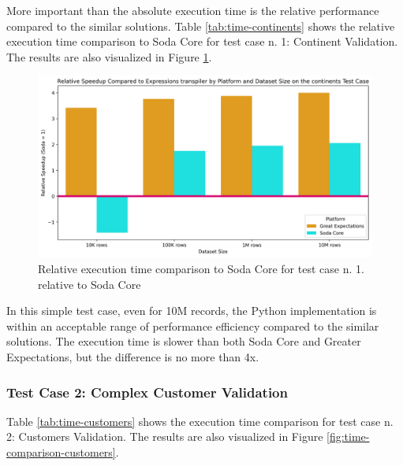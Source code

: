 More important than the absolute execution time is the relative performance compared to the similar solutions. Table \ref{tab:time-continents} shows the relative execution time comparison to Soda Core for test case n. 1: Continent Validation. The results are also visualized in Figure \ref{fig:time-comparison-continents-relative}.

\begin{table}[h] 
  \centering 
  \caption{Relative execution time comparison to Soda Core for test case n. 1: Continent Validation} 
  \label{tab:time-continents-relative} 
  
\end{table}

\begin{figure}[htbp]
  \centering
  \includegraphics[width=1.0\columnwidth]{result-analysis/plots/relative_speedup_comparison_continents.png}
  \caption{Relative execution time comparison to Soda Core for test case n. 1. relative to Soda Core}
  \label{fig:time-comparison-continents-relative}
\end{figure}

In this simple test case, even for 10M records, the Python implementation is within an acceptable range of performance efficiency compared to the similar solutions. The execution time is slower than both Soda Core and Greater Expectations, but the difference is no more than 4x. 


\subsubsection{Test Case 2: Complex Customer Validation}

Table \ref{tab:time-customers} shows the execution time comparison for test case n. 2: Customers Validation. The results are also visualized in Figure \ref{fig:time-comparison-customers}.

